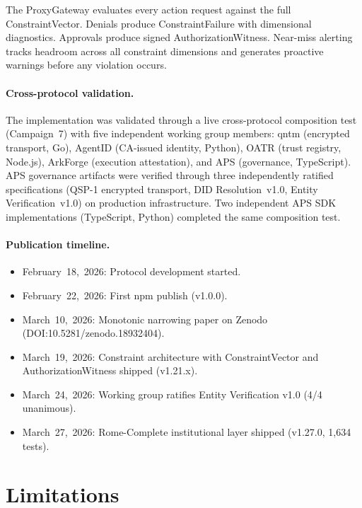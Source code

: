 \documentclass[sigconf,nonacm]{acmart}
\begin{document}
The ProxyGateway evaluates every action request against the full ConstraintVector.
Denials produce ConstraintFailure with dimensional diagnostics. Approvals produce
signed AuthorizationWitness. Near-miss alerting tracks headroom across all constraint
dimensions and generates proactive warnings before any violation occurs.

\paragraph{Cross-protocol validation.} The implementation was validated through a live
cross-protocol composition test (Campaign~7) with five independent working group members:
qntm (encrypted transport, Go), AgentID (CA-issued identity, Python), OATR (trust
registry, Node.js), ArkForge (execution attestation), and APS (governance, TypeScript).
APS governance artifacts were verified through three independently ratified specifications
(QSP-1 encrypted transport, DID Resolution~v1.0, Entity Verification~v1.0) on production
infrastructure. Two independent APS SDK implementations (TypeScript, Python) completed the
same composition test.

\paragraph{Publication timeline.}
\begin{itemize}
\item February~18,~2026: Protocol development started.
\item February~22,~2026: First npm publish (v1.0.0).
\item March~10,~2026: Monotonic narrowing paper on Zenodo (DOI:10.5281/zenodo.18932404).
\item March~19,~2026: Constraint architecture with ConstraintVector and
      AuthorizationWitness shipped (v1.21.x).
\item March~24,~2026: Working group ratifies Entity Verification v1.0 (4/4 unanimous).
\item March~27,~2026: Rome-Complete institutional layer shipped (v1.27.0, 1,634 tests).
\end{itemize}

\section{Limitations}
\end{document}
